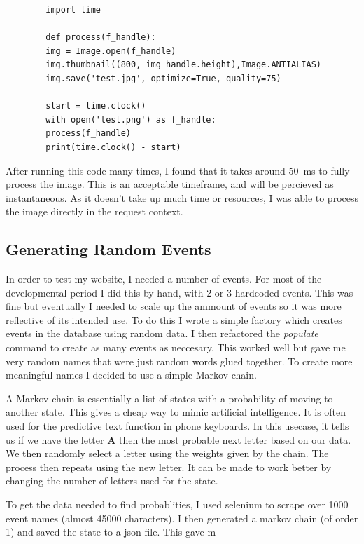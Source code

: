\documentclass[a4paper,oneside,12pt]{report}
\begin{document}
	\lstset{language=python}
	\begin{lstlisting}
		import time

		def process(f_handle):
		img = Image.open(f_handle)
		img.thumbnail((800, img_handle.height),Image.ANTIALIAS)
		img.save('test.jpg', optimize=True, quality=75)

		start = time.clock()
		with open('test.png') as f_handle:
		process(f_handle)
		print(time.clock() - start)
	\end{lstlisting}

	After running this code many times, I found that it takes around \SI{50}{\milli\second} to fully process the image. This is an acceptable timeframe, and will be percieved as instantaneous. As it doesn't take up much time or resources, I was able to process the image directly in the request context.

	\subsection{Generating Random Events}
	In order to test my website, I needed a number of events. For most of the developmental period I did this by hand, with 2 or 3 hardcoded events. This was fine but eventually I needed to scale up the ammount of events so it was more reflective of its intended use. To do this I wrote a simple factory which creates events in the database using random data. I then refactored the \textit{populate} command to create as many events as neccesary. This worked well but gave me very random names that were just random words glued together. To create more meaningful names I decided to use a simple Markov chain.

	A Markov chain is essentially a list of states with a probability of moving to another state. This gives a cheap way to mimic artificial intelligence. It is often used for the predictive text function in phone keyboards. In this usecase, it tells us if we have the letter \textbf{A} then the most probable next letter based on our data. We then randomly select a letter using the weights given by the chain. The process then repeats using the new letter. It can be made to work better by changing the number of letters used for the state.

	To get the data needed to find probablities, I used selenium to scrape over 1000 event names (almost 45000 characters). I then generated a markov chain (of order 1) and saved the state to a json file. This gave m
\end{document}
